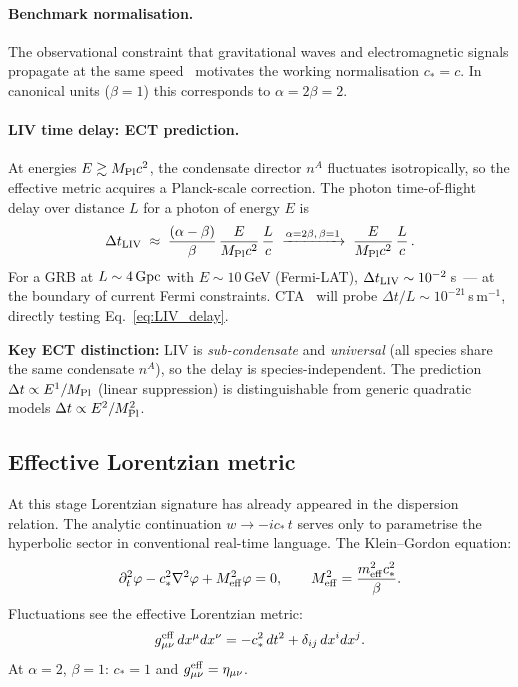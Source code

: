 \documentclass[11pt,a4paper]{article}
\numberwithin{equation}{section}
\begin{document}
\paragraph{Benchmark normalisation.}
The observational constraint that gravitational waves and
electromagnetic signals propagate at the same speed~\cite{LIGO_Virgo_GW170817_2017}
motivates the working normalisation $c_*=c$.
In canonical units ($\beta=1$) this corresponds to $\alpha=2\beta=2$.

\paragraph{LIV time delay: ECT prediction.}
At energies $E\gtrsim M_{\rm Pl}c^2$, the condensate director
$n^A$ fluctuates isotropically, so the effective metric acquires
a Planck-scale correction. The photon time-of-flight delay over
distance $L$ for a photon of energy $E$ is
\begin{equation}
  \Delta t_{\rm LIV}
  \;\approx\;
  \frac{(\alpha-\beta)}{\beta}\,\frac{E}{M_{\rm Pl}c^2}\,\frac{L}{c}
  \;\xrightarrow{\alpha=2\beta,\,\beta=1}\;
  \frac{E}{M_{\rm Pl}c^2}\,\frac{L}{c}\,.
  \label{eq:LIV_delay}
\end{equation}
For a GRB at $L\sim4\,{\rm Gpc}$ with $E\sim10$\,GeV (Fermi-LAT),
$\Delta t_{\rm LIV}\sim10^{-2}$\,s~--- at the boundary of current
Fermi constraints. CTA~\cite{CTA2020} will probe
$\Delta t/L\sim10^{-21}$\,s\,m$^{-1}$, directly testing
Eq.~\eqref{eq:LIV_delay}.

\textbf{Key ECT distinction:} LIV is \emph{sub-condensate} and
\emph{universal} (all species share the same condensate $n^A$),
so the delay is species-independent.
The prediction $\Delta t\propto E^1/M_{\rm Pl}$ (linear suppression)
is distinguishable from generic quadratic models
$\Delta t\propto E^2/M_{\rm Pl}^2$.


\subsection{Effective Lorentzian metric}
\label{sec:effective_metric}

At this stage Lorentzian signature has already appeared in the
dispersion relation. The analytic continuation
$w\to -ic_*\,t$ serves only to parametrise the hyperbolic sector
in conventional real-time language.
The Klein--Gordon equation:
\begin{equation}
  \label{eq:KG}
  \partial_t^2\varphi - c_*^2\nabla^2\varphi + M_{\rm eff}^2\varphi = 0,
  \qquad
  M_{\rm eff}^2 = \frac{m_{\rm eff}^2 c_*^2}{\beta}.
\end{equation}
Fluctuations see the effective Lorentzian metric:
\begin{equation}
  \label{eq:eff_metric}
  g^{\rm eff}_{\mu\nu}\,dx^\mu dx^\nu
  = -c_*^2\,dt^2 + \delta_{ij}\,dx^i dx^j.
\end{equation}
At $\alpha=2$, $\beta=1$: $c_*=1$ and
$g^{\rm eff}_{\mu\nu}=\eta_{\mu\nu}$.
\end{document}
